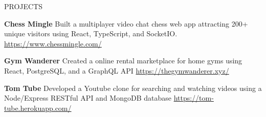 \documentclass{resume} %
\begin{document}

\begin{rSection}{PROJECTS}
\vspace{-1.25em}

\item \textbf{Chess Mingle} {Built a multiplayer video chat chess web app attracting 200+ unique visitors using React, TypeScript, and SocketIO.}
\href{https://www.chessmingle.com/}{https://www.chessmingle.com/}

\item \textbf{Gym Wanderer} {Created a online rental marketplace for home gyms using React, PostgreSQL, and a GraphQL API}
\href{https://thegymwanderer.xyz/}{https://thegymwanderer.xyz/}

\item \textbf{Tom Tube} {Developed a Youtube clone for searching and watching videos using a Node/Express RESTful API and MongoDB database}
\href{https://tom-tube.herokuapp.com/}{https://tom-tube.herokuapp.com/}




\end{rSection} 






\end{document}
